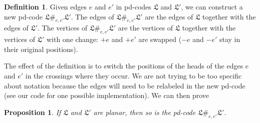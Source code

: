 \documentclass[amsmath,secnumarabic,floatfix,amssymb,nofootinbib,nobibnotes,letterpaper,11pt,tightenlines,showkeys]{revtex4}
\newtheorem{proposition}[theorem]{Proposition}
\theoremstyle{definition}
\newtheorem{definition}[theorem]{Definition}
\begin{document}
\begin{definition}
Given edges $e$ and $e'$ in pd-codes $\mathfrak{L}$ and $\mathfrak{L}'$, we can construct a new pd-code $\mathfrak{L} \#_{e,e'} \mathfrak{L'}$. The edges of $\mathfrak{L} \#_{e,e'} \mathfrak{L'}$ are the edges of $\mathfrak{L}$ together with the edges of $\mathfrak{L'}$. The vertices of $\mathfrak{L} \#_{e,e'} \mathfrak{L'}$ are the vertices of $\mathfrak{L}$ together with the vertices of $\mathfrak{L'}$ with one change: $+e$ and $+e'$ are swapped ($-e$ and $-e'$ stay in their original positions).
\end{definition}
The effect of the definition is to switch the positions of the heads of the edges $e$ and $e'$ in the crossings where they occur. We are not trying to be too specific about notation because the edges will need to be relabeled in the new pd-code (see our code for one possible implementation).
We can then prove
\begin{proposition}
If $\mathfrak{L}$ and $\mathfrak{L'}$ are planar, then so is the pd-code $\mathfrak{L} \#_{e,e'} \mathfrak{L'}$.
\end{proposition}
\end{document}
